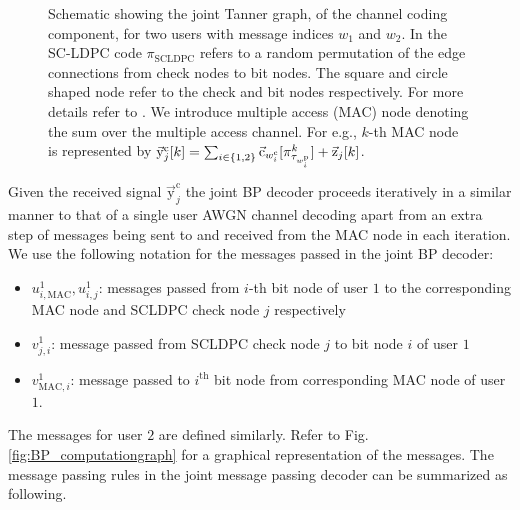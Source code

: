 \begin{figure}[!ht]
  \centering
  \resizebox{0.65\textwidth}{!}{}
  \caption{Schematic showing the joint Tanner graph, of the channel coding component, for two users with message indices $w_1$ and $w_2$. In the SC-LDPC code $\pi_{\text{SCLDPC}}$ refers to a random permutation of the edge connections from  check nodes to bit nodes. The square and circle shaped node refer to the check and bit nodes respectively. For more details refer to \cite{kudekar2011threshold}. We introduce multiple access (MAC) node denoting the sum over the multiple access channel. For e.g., $k$-th MAC node is represented by $\vec{\mathrm{y}}_j^{\mathrm{c}}[k]=\sum_{i\in\{1,2\}}\vec{\mathrm{c}}_{w_i^{\mathrm{c}}}[\pi^k_{\tau_{w_i^\mathrm{p}}}]+\vec{\mathrm{z}}_{j}[k]$.}
  \label{fig:decodergraph}
\end{figure}

Given the received signal $\vec{\mathrm{y}}_j^{\mathrm{c}}$ the joint BP decoder proceeds iteratively in a similar manner to that of a single user AWGN channel decoding apart from an extra step of messages being sent to and received from the MAC node in each iteration. We use the following notation for the messages passed in the joint BP decoder:
\begin{itemize}
\item $u^{1}_{i,\text{MAC}},u^{1}_{i,j}$: messages passed from $i$-th bit node of user $1$ to the corresponding MAC node and  SCLDPC check node $j$ respectively
\item $v^{1}_{j,i}$: message passed from SCLDPC check node $j$ to bit node $i$ of user $1$
\item $v^{1}_{\text{MAC},i}$: message passed to $i^{\text{th}}$ bit node from corresponding MAC node of user $1$.
\end{itemize}
The messages for user $2$ are defined similarly. Refer to Fig. \ref{fig:BP_computationgraph} for a graphical representation of the messages. The message passing rules in the joint message passing decoder can be summarized as following.

